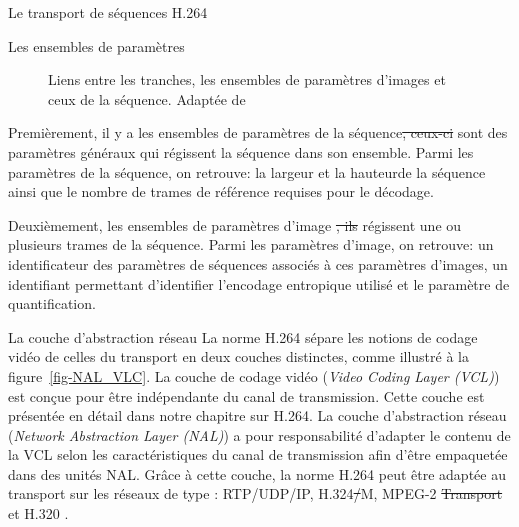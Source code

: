 \documentclass[letterpaper, twoside, 12pt,memoire]{thETS}
\newcommand{\ang}[1]{(\textit{#1})}
\newcommand{\fig}[1]{figure~\ref{#1}}
\providecommand{\DIFadd}[1]{{\protect\color{blue}\uwave{#1}}} %
\providecommand{\DIFdel}[1]{{\protect\color{red}\sout{#1}}}                      %
\providecommand{\DIFaddbegin}{} %
\providecommand{\DIFaddend}{} %
\providecommand{\DIFdelbegin}{} %
\providecommand{\DIFdelend}{} %
\begin{document}
\begin{chapter}{Le transport de séquences H.264}
\begin{section}{Les ensembles de paramètres}
\begin{figure}[htb]
\centering
{}
\caption{Liens entre les tranches, les ensembles de paramètres d'images et ceux
de la séquence. Adaptée de \citet[p.~53]{Superiori2006}}
\label{fig-ParameterSet}
\end{figure}

Premièrement, il y a les ensembles de paramètres de la séquence\DIFdelbegin \DIFdel{, ceux-ci }\DIFdelend \DIFaddbegin \DIFadd{. Ceux-ci }\DIFaddend sont
des paramètres généraux qui régissent la séquence dans son ensemble. Parmi les
paramètres de la séquence, on retrouve: la largeur et la hauteur\DIFaddbegin \DIFadd{, en pixels, }\DIFaddend de la séquence
ainsi que le nombre de trames de référence requises pour le décodage.

Deuxièmement, \DIFaddbegin \DIFadd{il y a }\DIFaddend les ensembles de paramètres d'image \DIFdelbegin \DIFdel{, ils }\DIFdelend \DIFaddbegin \DIFadd{qui }\DIFaddend régissent une ou
plusieurs trames de la séquence. Parmi les paramètres d'image, on retrouve: un
identificateur des paramètres de séquences associés à ces paramètres d'images,
un identifiant permettant d'identifier l'encodage entropique utilisé et le
paramètre de quantification.


\end{section}

\begin{section}{La couche d'abstraction réseau}
\label{sect-NAL}
La norme H.264 sépare les notions de codage vidéo de celles du transport en deux
couches distinctes, comme illustré à la \fig{fig-NAL_VLC}. La couche de codage
vidéo \ang{Video Coding Layer (VCL)} est conçue pour être indépendante du canal
de transmission. Cette couche est présentée en détail dans notre chapitre sur
H.264. La couche d'abstraction réseau \ang{Network Abstraction Layer (NAL)} a
pour responsabilité d'adapter le contenu de la VCL selon les caractéristiques du
canal de transmission afin d'être empaquetée dans des unités NAL. Grâce à cette
couche, la norme H.264 peut être adaptée au transport sur les réseaux de type :
RTP/UDP/IP, H.324\DIFdelbegin \DIFdel{/}\DIFdelend M, MPEG-2 \DIFdelbegin \DIFdel{Transport }\DIFdelend \DIFaddbegin \DIFadd{TS }\DIFaddend et H.320 \citep{Wenger2003}.


\end{section}
\end{chapter}
\end{document}
